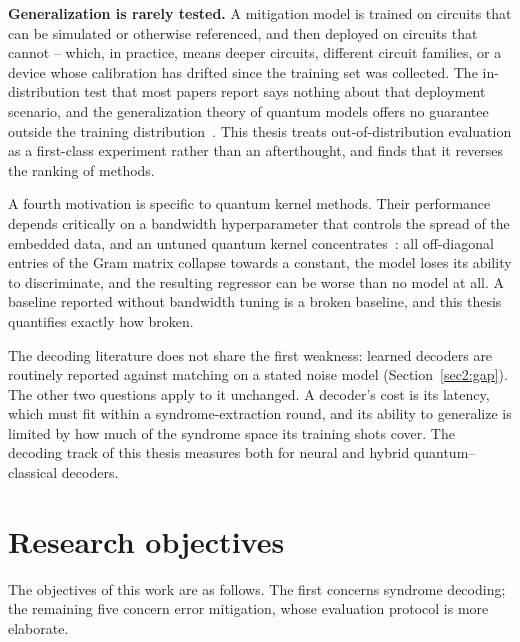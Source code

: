\documentclass[Thesis.tex]{subfiles}
\begin{document}
\textbf{Generalization is rarely tested.} A mitigation model is trained on circuits
that can be simulated or otherwise referenced, and then deployed on circuits that
cannot -- which, in practice, means deeper circuits, different circuit families, or
a device whose calibration has drifted since the training set was collected. The
in-distribution test that most papers report says nothing about that deployment
scenario, and the generalization theory of quantum models offers no guarantee
outside the training distribution~\cite{caro2022generalization,caro2023ood}. This thesis treats out-of-distribution evaluation as a first-class
experiment rather than an afterthought, and finds that it reverses the ranking of
methods.

A fourth motivation is specific to quantum kernel methods. Their performance depends
critically on a bandwidth hyperparameter that controls the spread of the embedded
data, and an untuned quantum kernel
concentrates~\cite{shaydulin2022importance,canatar2023bandwidth,thanasilp2024exponential}:
all off-diagonal entries of the Gram matrix collapse towards a constant, the model loses its ability to
discriminate, and the resulting regressor can be worse than no model at all. A
baseline reported without bandwidth tuning is a broken baseline, and this thesis
quantifies exactly how broken.

The decoding literature does not share the first weakness: learned decoders are
routinely reported against matching on a stated noise model
(Section~\ref{sec2:gap}). The other two questions apply to it unchanged. A
decoder's cost is its latency, which must fit within a syndrome-extraction round,
and its ability to generalize is limited by how much of the syndrome space its
training shots cover. The decoding track of this thesis measures both for neural and
hybrid quantum--classical decoders.

\section{Research objectives}

The objectives of this work are as follows. The first concerns syndrome decoding;
the remaining five concern error mitigation, whose evaluation protocol is more
elaborate.
\end{document}
